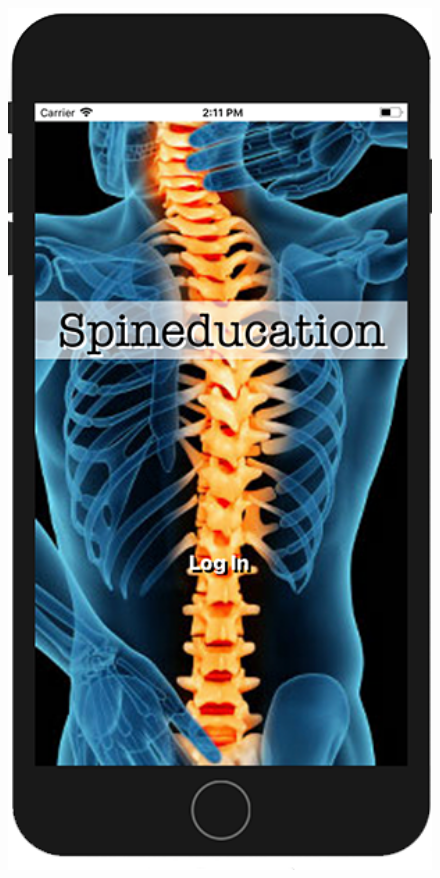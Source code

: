 \documentclass[final]{beamer}
\newlength{\onecolwid}
\begin{document}
\begin{frame}[t]
\begin{columns}[t]
\begin{column}{\onecolwid}
\begin{figure}
\includegraphics[width=30cm,height=40cm,keepaspectratio]{homescreen.png}
\end{figure}


\end{column}
\end{columns}
\end{frame}
\end{document}
